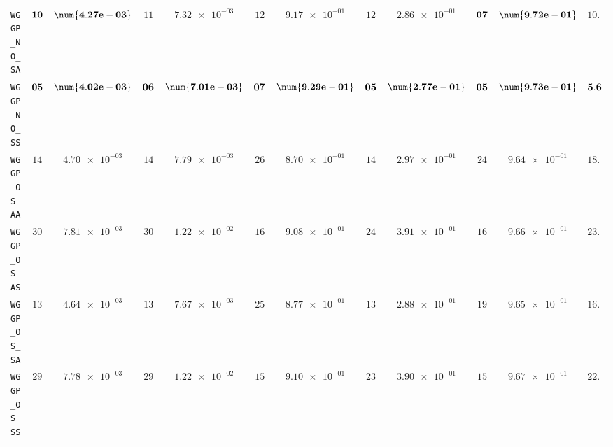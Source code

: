 \begin{xltabular}{\textwidth}{l||cC|cC|cC|cC|cC||c}
	\texttt{WGGP\_NO\_SA} & $\bf 10$ & $\bf \num{4.27e-03}$ & $ 11$ & $ \num{7.32e-03}$ & $ 12$ & $ \num{9.17e-01}$ & $ 12$ & $ \num{2.86e-01}$ & $\bf 07$ & $\bf \num{9.72e-01}$ & $ 10.4$  \\
	\texttt{WGGP\_NO\_SS} & $\bf 05$ & $\bf \num{4.02e-03}$ & $\bf 06$ & $\bf \num{7.01e-03}$ & $\bf 07$ & $\bf \num{9.29e-01}$ & $\bf 05$ & $\bf \num{2.77e-01}$ & $\bf 05$ & $\bf \num{9.73e-01}$ & $\bf 5.6$  \\
	\texttt{WGGP\_OS\_AA} & $ 14$ & $ \num{4.70e-03}$ & $ 14$ & $ \num{7.79e-03}$ & $ 26$ & $ \num{8.70e-01}$ & $ 14$ & $ \num{2.97e-01}$ & $ 24$ & $ \num{9.64e-01}$ & $ 18.4$  \\
	\texttt{WGGP\_OS\_AS} & $ 30$ & $ \num{7.81e-03}$ & $ 30$ & $ \num{1.22e-02}$ & $ 16$ & $ \num{9.08e-01}$ & $ 24$ & $ \num{3.91e-01}$ & $ 16$ & $ \num{9.66e-01}$ & $ 23.2$  \\
	\texttt{WGGP\_OS\_SA} & $ 13$ & $ \num{4.64e-03}$ & $ 13$ & $ \num{7.67e-03}$ & $ 25$ & $ \num{8.77e-01}$ & $ 13$ & $ \num{2.88e-01}$ & $ 19$ & $ \num{9.65e-01}$ & $ 16.6$  \\
	\texttt{WGGP\_OS\_SS} & $ 29$ & $ \num{7.78e-03}$ & $ 29$ & $ \num{1.22e-02}$ & $ 15$ & $ \num{9.10e-01}$ & $ 23$ & $ \num{3.90e-01}$ & $ 15$ & $ \num{9.67e-01}$ & $ 22.2$  \\

\end{xltabular}
